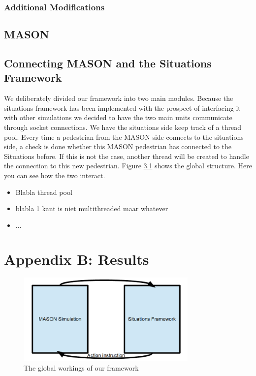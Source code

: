 \documentclass[11pt]{book}
\begin{document}
\subsection{Additional Modifications}


\section{MASON}

\section{Connecting MASON and the Situations Framework}
We deliberately divided our framework into two main modules. Because the situations framework has been implemented with the prospect of interfacing it with other simulations we decided to have the two main units communicate through socket connections. We have the situations side keep track of a thread pool. Every time a pedestrian from the MASON side connects to the situations side, a check is done whether this MASON pedestrian has connected to the Situations before. If this is not the case, another thread will be created to handle the connection to this new pedestrian.  Figure \ref{framework}  shows the global structure. Here you can see how the two interact.
\begin{itemize}
\item Blabla thread pool
\item blabla 1 kant is niet multithreaded maar whatever
\item ...
\end{itemize}


\chapter{Appendix B: Results}
\begin{figure}
\centering
\includegraphics[width=250pt]{framework}
\caption{The global workings of our framework}
\label{framework}
\end{figure}






\end{document}
